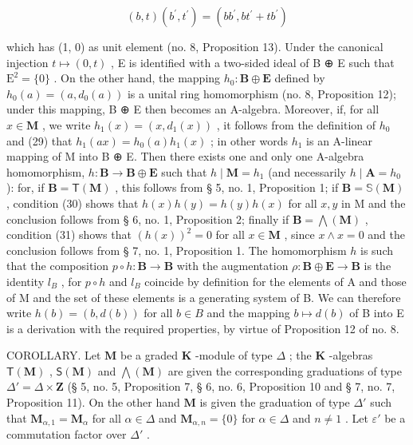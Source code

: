 \[
(b, t) (b ^ {\prime}, t ^ {\prime}) = (b b ^ {\prime}, b t ^ {\prime} + t b ^ {\prime})
\]

which has (1, 0) as unit element (no. 8, Proposition 13). Under the canonical injection \(t \mapsto (0, t)\) , E is identified with a two-sided ideal of B ⊕ E such that \(\mathrm{E}^2 = \{0\}\) . On the other hand, the mapping \(h_0 \colon \mathbf{B} \oplus \mathbf{E}\) defined by \(h_0(a) = (a, d_0(a))\) is a unital ring homomorphism (no. 8, Proposition 12); under this mapping, B ⊕ E then becomes an A-algebra. Moreover, if, for all \(x \in \mathbf{M}\) , we write \(h_1(x) = (x, d_1(x))\) , it follows from the definition of \(h_0\) and (29) that \(h_1(ax) = h_0(a)h_1(x)\) ; in other words \(h_1\) is an A-linear mapping of M into B ⊕ E. Then there exists one and only one A-algebra homomorphism, \(h \colon \mathbf{B} \to \mathbf{B} \oplus \mathbf{E}\) such that \(h \mid \mathbf{M} = h_1\) (and necessarily \(h \mid \mathbf{A} = h_0\) ): for, if \(\mathbf{B} = \mathsf{T}(\mathbf{M})\) , this follows from § 5, no. 1, Proposition 1; if \(\mathbf{B} = \mathbb{S}(\mathbf{M})\) , condition (30) shows that \(h(x)h(y) = h(y)h(x)\) for all \(x, y\) in M and the conclusion follows from § 6, no. 1, Proposition 2; finally if \(\mathbf{B} = \bigwedge (\mathbf{M})\) , condition (31) shows that \((h(x))^2 = 0\) for all \(x \in \mathbf{M}\) , since \(x \wedge x = 0\) and the conclusion follows from § 7, no. 1, Proposition 1. The homomorphism \(h\) is such that the composition \(p \circ h \colon \mathbf{B} \to \mathbf{B}\) with the augmentation \(\rho \colon \mathbf{B} \oplus \mathbf{E} \to \mathbf{B}\) is the identity \(l_B\) , for \(p \circ h\) and \(l_B\) coincide by definition for the elements of A and those of M and the set of these elements is a generating system of B. We can therefore write \(h(b) = (b, d(b))\) for all \(b \in B\) and the mapping \(b \mapsto d(b)\) of B into E is a derivation with the required properties, by virtue of Proposition 12 of no. 8.

COROLLARY. Let \(\mathbf{M}\) be a graded \(\mathbf{K}\) -module of type \(\Delta\) ; the \(\mathbf{K}\) -algebras \(\mathsf{T}(\mathbf{M})\) , \(\mathsf{S}(\mathbf{M})\) and \(\bigwedge (\mathbf{M})\) are given the corresponding graduations of type \(\Delta' = \Delta \times \mathbf{Z}\) (§ 5, no. 5, Proposition 7, § 6, no. 6, Proposition 10 and § 7, no. 7, Proposition 11). On the other hand \(\mathbf{M}\) is given the graduation of type \(\Delta'\) such that \(\mathbf{M}_{\alpha,1} = \mathbf{M}_{\alpha}\) for all \(\alpha \in \Delta\) and \(\mathbf{M}_{\alpha,n} = \{0\}\) for \(\alpha \in \Delta\) and \(n \neq 1\) . Let \(\varepsilon'\) be a commutation factor over \(\Delta'\) .

